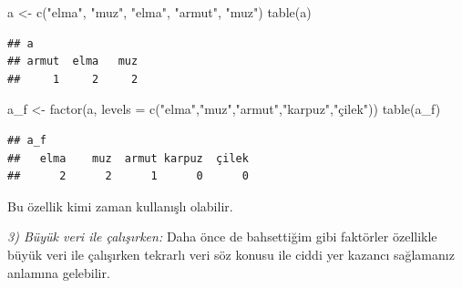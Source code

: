 \documentclass[
]{book}
\newenvironment{Shaded}{\begin{snugshade}}{\end{snugshade}}
\newcommand{\AttributeTok}[1]{\textcolor[rgb]{0.77,0.63,0.00}{#1}}
\newcommand{\FunctionTok}[1]{\textcolor[rgb]{0.00,0.00,0.00}{#1}}
\newcommand{\NormalTok}[1]{#1}
\newcommand{\OtherTok}[1]{\textcolor[rgb]{0.56,0.35,0.01}{#1}}
\newcommand{\StringTok}[1]{\textcolor[rgb]{0.31,0.60,0.02}{#1}}
\begin{document}
\begin{Shaded}
\begin{Highlighting}[]
\NormalTok{a }\OtherTok{\textless{}{-}}  \FunctionTok{c}\NormalTok{(}\StringTok{"elma"}\NormalTok{, }\StringTok{"muz"}\NormalTok{, }\StringTok{"elma"}\NormalTok{, }\StringTok{"armut"}\NormalTok{, }\StringTok{"muz"}\NormalTok{)}
\FunctionTok{table}\NormalTok{(a)}
\end{Highlighting}
\end{Shaded}

\begin{verbatim}
## a
## armut  elma   muz 
##     1     2     2
\end{verbatim}

\begin{Shaded}
\begin{Highlighting}[]
\NormalTok{a\_f }\OtherTok{\textless{}{-}} \FunctionTok{factor}\NormalTok{(a, }\AttributeTok{levels =} \FunctionTok{c}\NormalTok{(}\StringTok{"elma"}\NormalTok{,}\StringTok{"muz"}\NormalTok{,}\StringTok{"armut"}\NormalTok{,}\StringTok{"karpuz"}\NormalTok{,}\StringTok{"çilek"}\NormalTok{))}
\FunctionTok{table}\NormalTok{(a\_f)}
\end{Highlighting}
\end{Shaded}

\begin{verbatim}
## a_f
##   elma    muz  armut karpuz  çilek 
##      2      2      1      0      0
\end{verbatim}

Bu özellik kimi zaman kullanışlı olabilir.

\emph{3) Büyük veri ile çalışırken:} Daha önce de bahsettiğim gibi faktörler özellikle büyük veri ile çalışırken tekrarlı veri söz konusu ile ciddi yer kazancı sağlamanız anlamına gelebilir.

  
\end{document}
